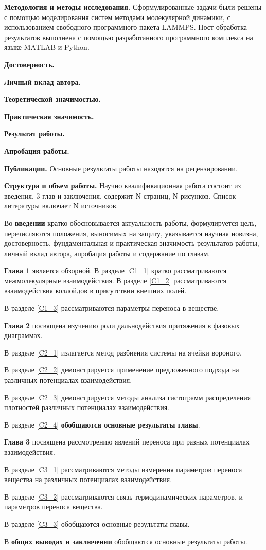 \textbf{Методология и методы исследования.} 
Сформулированные задачи были решены с помощью моделирования систем методами молекулярной динамики, с использованием свободного программного пакета LAMMPS. Пост-обработка результатов выполнена с помощью разработанного программного комплекса на языке MATLAB и Python.


\textbf{Достоверность.} 

\textbf{Личный вклад автора.}

\textbf{Теоретической значимостью.} 

\textbf{Практическая значимость.} 

\textbf{Результат работы.} 

\textbf{Апробация работы.} 

\textbf{Публикации.} 
Основные результаты работы находятся на рецензировании.

\textbf{Структура и объем работы.} 
Научно квалификационная работа состоит из введения, 3 глав и заключения, содержит N страниц, N рисунков.
Список литературы включает N источников.

Во \textbf{введении} кратко обосновывается актуальность работы, формулируется цель, перечисляются положения, выносимых на защиту, указывается научная новизна, достоверность, фундаментальная и практическая значимость результатов работы, личный вклад автора, апробация работы и содержание по главам.


\textbf{Глава 1} является обзорной.
В разделе \ref{C1_1} кратко рассматриваются межмолекулярные взаимодействия.
В разделе \ref{C1_2} рассматриваются взаимодействия коллойдов в присутствии внешних полей.

В разделе \ref{C1_3} рассматриваются параметры переноса в веществе. 


\textbf{Глава 2} посвящена изучению роли дальнодействия притяжения в фазовых диаграммах.


В разделе \ref{C2_1} излагается метод разбиения системы на ячейки вороного.

В разделе \ref{C2_2} демонстрируется применение предложенного подхода на различных потенциалах взаимодействия.

В разделе \ref{C2_3} демонстрируется методы анализа гистограмм распределения плотностей различных потенциалах взаимодействия.

В разделе \ref{C2_4} \textbf{обобщаются основные результаты главы}.

\textbf{Глава 3} посвящена рассмотрению явлений переноса при разных потенциалах взаимодействия.

В разделе \ref{C3_1} рассматриваются методы измерения параметров переноса вещества на различных потенциалах взаимодействия.

В разделе \ref{C3_2} рассматриваются связь термодинамических параметров, и параметров переноса вещества.

В разделе \ref{C3_3} обобщаются основные результаты главы.

В \textbf{общих выводах и заключении} обобщаются основные результаты работы.
